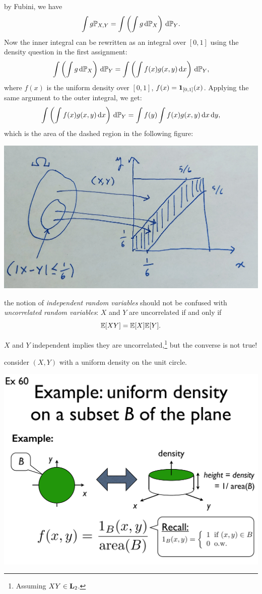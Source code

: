 \documentclass{article}
\begin{document}
 by Fubini, we have
\[ \int g {\mathbb P}_{X,Y} = \int \left( \int g \,\mathrm{d} {\mathbb P}_X \right) \,\mathrm{d} {\mathbb P}_Y. \]
Now the inner integral can be rewritten as an integral over $[0, 1]$ using the density question in the first assignment:
\[ \int \left( \int g \,\mathrm{d} {\mathbb P}_X \right) \,\mathrm{d} {\mathbb P}_Y = \int \left( \int f(x) g(x,y) \,\mathrm{d} x \right) \,\mathrm{d} {\mathbb P}_Y, \]
where $f(x)$ is the uniform density over $[0, 1]$, $f(x) = {\mathbf 1}_{[0, 1]}(x)$. Applying the same argument to the outer integral, we get:
\[ \int \left( \int f(x) g(x,y) \,\mathrm{d} x \right) \,\mathrm{d} {\mathbb P}_Y = \int f(y) \int f(x) g(x,y) \,\mathrm{d} x \,\mathrm{d} y, \]
which is the area of the dashed region in the following figure: 
\begin{center}
	\includegraphics[width=0.5\linewidth]{figures/meeting}
\end{center}

 the notion of \emph{independent random variables} should not be confused with \emph{uncorrelated random variables}: $X$ and $Y$ are uncorrelated if and only if \[ {\mathbb E}[XY] = {\mathbb E}[X] {\mathbb E}[Y]. \]

 $X$ and $Y$ independent implies they are uncorrelated,\footnote{Assuming  $XY \in \mathbf L_2$.} but the converse is not true!

 consider $(X,Y)$ with a uniform density on the unit circle. 
\begin{center}
\includegraphics[width=0.7\linewidth]{figures/uniform-on-circle}
\end{center}
\end{document}
